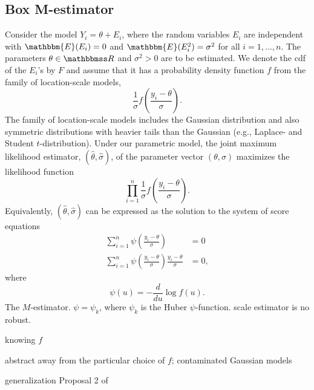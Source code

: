 \documentclass[a4paper,11pt]{scrreprt}
\begin{document}
\subsection{Box M-estimator}
Consider the model $Y_i = \theta + E_i$, where the random variables $E_i$ are independent with $\mathbbm{E}(E_i)=0$ and $\mathbbm{E}(E_i^2)=\sigma^2$ for all $i=1,\ldots,n$. The parameters $\theta \in \R$ and $\sigma^2 > 0$ are to be estimated. We denote the cdf of the $E_i$'s by $F$ and assume that it has a probability density function $f$ from the family of location-scale models, 
\begin{equation*}
   \frac{1}{\sigma}f\left( \frac{y_i - \theta}{\sigma}\right).
\end{equation*}
\noindent The family of location-scale models includes the Gaussian distribution and also symmetric distributions with heavier tails than the Gaussian (e.g., Laplace- and Student $t$-distribution). Under our parametric model, the joint maximum likelihood estimator, $(\hat{\theta}, \hat{\sigma})$, of the parameter vector $(\theta, \sigma)$ maximizes the likelihood function 
\begin{equation*}
   \prod_{i=1}^n  \frac{1}{\sigma}f\left( \frac{y_i - \theta}{\sigma}\right).
\end{equation*}
\noindent Equivalently, $(\hat{\theta}, \hat{\sigma})$ can be expressed as the solution to the system of score equations
\begin{align}
   \sum_{i=1}^n \psi\left( \frac{y_i - \theta}{\sigma}\right) &= 0 \\
   \sum_{i=1}^n \psi\left( \frac{y_i - \theta}{\sigma}\right) \frac{y_i - \theta}{\sigma} &= 0, 
\end{align}
\noindent where
\begin{equation*}
   \psi(u) = -\frac{d}{d u} \log f(u).
\end{equation*}
\noindent The $M$-estimator. $\psi = \psi_k$, where $\psi_k$ is the Huber $\psi$-function.  scale estimator is no robust.

knowing $f$

abstract away from the particular choice of $f$; contaminated Gaussian models 

generalization Proposal 2 of \citet{huber1964}  



\end{document}
